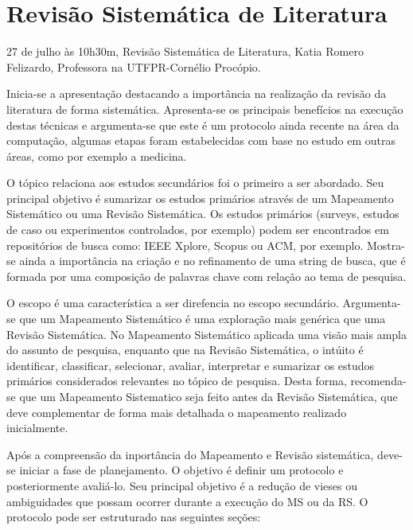 \section{Revisão Sistemática de Literatura}

\begin{center}
  \vspace{1cm}
  27 de julho às 10h30m, Revisão Sistemática de Literatura, Katia Romero Felizardo, Professora na UTFPR-Cornélio Procópio.
  \vspace{1cm}
\end{center}

Inicia-se a apresentação destacando a importância na realização da revisão da literatura de forma sistemática. Apresenta-se os principais benefícios na execução destas técnicas e argumenta-se que este é um protocolo ainda recente na área da computação, algumas etapas foram estabelecidas com base no estudo em outras áreas, como por exemplo a medicina. 

O tópico relaciona aos estudos secundários foi o primeiro a ser abordado. Seu principal objetivo é sumarizar os estudos primários através de um Mapeamento Sistemático ou uma Revisão Sistemática. Os estudos primários (surveys, estudos de caso ou experimentos controlados, por exemplo) podem ser encontrados em repositórios de busca como: IEEE Xplore, Scopus ou ACM, por exemplo. Mostra-se ainda a importância na criação e no refinamento de uma string de busca, que é formada por uma composição de palavras chave com relação ao tema de pesquisa.

O escopo é uma característica a ser direfencia no escopo secundário. Argumenta-se que um Mapeamento Sistemático é uma exploração mais genérica que uma Revisão Sistemática. No Mapeamento Sistemático aplicada uma visão mais ampla do assunto de pesquisa, enquanto que na Revisão Sistemática, o intúito é identificar, classificar, selecionar, avaliar, interpretar e sumarizar os estudos primários considerados relevantes no tópico de pesquisa. Desta forma, recomenda-se que um Mapeamento Sistematico seja feito antes da Revisão Sistemática, que deve complementar de forma mais detalhada o mapeamento realizado inicialmente.

Após a compreensão da inportância do Mapeamento e Revisão sistemática, deve-se iniciar a fase de planejamento. O objetivo é definir um protocolo e posteriormente avaliá-lo. Seu principal objetivo é a redução de vieses ou ambiguidades que possam ocorrer durante a execução do MS ou da RS. O protocolo pode ser estruturado nas seguintes seções:

